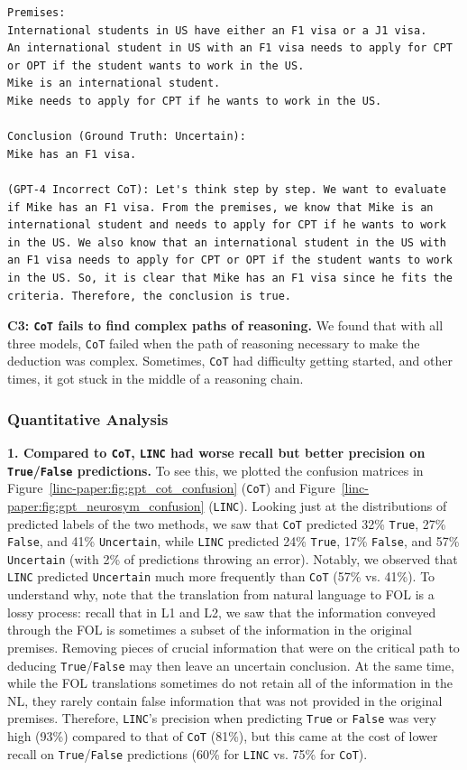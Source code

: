 \begin{lstlisting}[breaklines=true,basicstyle=\small\ttfamily]
Premises:
International students in US have either an F1 visa or a J1 visa.
An international student in US with an F1 visa needs to apply for CPT or OPT if the student wants to work in the US.
Mike is an international student.
Mike needs to apply for CPT if he wants to work in the US.

Conclusion (Ground Truth: Uncertain):
Mike has an F1 visa.

(GPT-4 Incorrect CoT): Let's think step by step. We want to evaluate if Mike has an F1 visa. From the premises, we know that Mike is an international student and needs to apply for CPT if he wants to work in the US. We also know that an international student in the US with an F1 visa needs to apply for CPT or OPT if the student wants to work in the US. So, it is clear that Mike has an F1 visa since he fits the criteria. Therefore, the conclusion is true.
\end{lstlisting}

\textbf{C3: \texttt{CoT} fails to find complex paths of reasoning.} We found that with all three models, \texttt{CoT} failed when the path of reasoning necessary to make the deduction was complex. Sometimes, \texttt{CoT} had difficulty getting started, and other times, it got stuck in the middle of a reasoning chain.

\subsubsection{Quantitative Analysis}

\textbf{1. Compared to \texttt{CoT}, \texttt{LINC} had worse recall but better precision on \texttt{True}/\texttt{False} predictions.} To see this,
we plotted the confusion matrices in Figure~\ref{linc-paper:fig:gpt_cot_confusion} (\texttt{CoT}) and Figure~\ref{linc-paper:fig:gpt_neurosym_confusion} (\texttt{LINC}).
Looking just at the distributions of predicted labels of the two methods, we saw that \texttt{CoT} predicted 32\% \texttt{True}, 27\% \texttt{False}, and 41\% \texttt{Uncertain}, while \texttt{LINC} predicted 24\% \texttt{True}, 17\% \texttt{False}, and 57\% \texttt{Uncertain} (with 2\% of predictions throwing an error).
Notably, we observed that \texttt{LINC} predicted \texttt{Uncertain} much more frequently than \texttt{CoT} (57\% vs. 41\%).
To understand why, note that the translation from natural language to FOL is a lossy process: recall that in L1 and L2, we saw that the information conveyed through the FOL is sometimes a subset of the information in the original premises. Removing pieces of crucial information that were on the critical path to deducing \texttt{True}/\texttt{False} may then leave an uncertain conclusion.
At the same time, while the FOL translations sometimes do not retain all of the information in the NL, they rarely contain false information that was not provided in the original premises.
Therefore, \texttt{LINC}'s precision when predicting \texttt{True} or \texttt{False} was very high (93\%) compared to that of \texttt{CoT} (81\%), but this came at the cost of lower recall on \texttt{True}/\texttt{False} predictions (60\% for \texttt{LINC} vs. 75\% for \texttt{CoT}).

